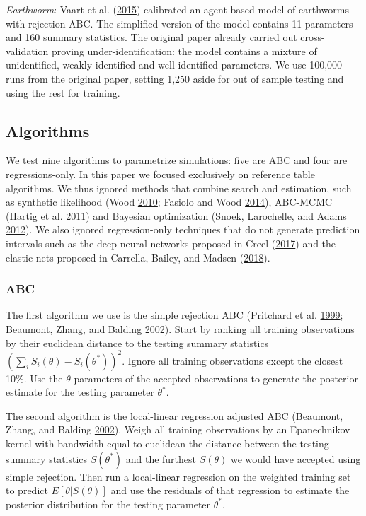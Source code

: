 \documentclass[]{article}
\begin{document}
\emph{Earthworm}: Vaart et al. (\protect\hyperlink{ref-VanderVaart2015}{2015}) calibrated an agent-based model of earthworms with rejection ABC. The simplified version of the model contains 11 parameters and 160 summary statistics. The original paper already carried out cross-validation proving under-identification: the model contains a mixture of unidentified, weakly identified and well identified parameters.
We use 100,000 runs from the original paper, setting 1,250 aside for out of sample testing and using the rest for training.

\hypertarget{algorithms}{%
\subsection{Algorithms}\label{algorithms}}

We test nine algorithms to parametrize simulations: five are ABC and four are regressions-only.
In this paper we focused exclusively on reference table algorithms.
We thus ignored methods that combine search and estimation, such as synthetic likelihood (Wood \protect\hyperlink{ref-Wood2010}{2010}; Fasiolo and Wood \protect\hyperlink{ref-fasiolo2014introduction}{2014}), ABC-MCMC (Hartig et al. \protect\hyperlink{ref-hartig_statistical_2011}{2011}) and Bayesian optimization (Snoek, Larochelle, and Adams \protect\hyperlink{ref-Snoek2012}{2012}).
We also ignored regression-only techniques that do not generate prediction intervals such as the deep neural networks proposed in Creel (\protect\hyperlink{ref-Creel2017}{2017}) and the elastic nets proposed in Carrella, Bailey, and Madsen (\protect\hyperlink{ref-Carrella2018}{2018}).

\hypertarget{abc}{%
\subsubsection{ABC}\label{abc}}

The first algorithm we use is the simple rejection ABC (Pritchard et al. \protect\hyperlink{ref-Pritchard1999}{1999}; Beaumont, Zhang, and Balding \protect\hyperlink{ref-Beaumont2002}{2002}). Start by ranking all training observations by their euclidean distance to the testing summary statistics \(\left( \sum_i S_i(\theta) - S_i(\theta^*) \right)^2\). Ignore all training observations except the closest 10\%.
Use the \(\theta\) parameters of the accepted observations to generate the posterior estimate for the testing parameter \(\theta^*\).

The second algorithm is the local-linear regression adjusted ABC (Beaumont, Zhang, and Balding \protect\hyperlink{ref-Beaumont2002}{2002}).
Weigh all training observations by an Epanechnikov kernel with bandwidth equal to euclidean the distance between the testing summary statistics \(S(\theta^*)\) and the furthest \(S(\theta)\) we would have accepted using simple rejection.
Then run a local-linear regression on the weighted training set to predict \(E[\theta |S(\theta)]\) and use the residuals of that regression to estimate the posterior distribution for the testing parameter \(\theta^*\).
\end{document}
